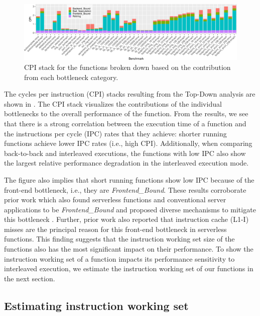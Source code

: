 \begin{figure}
  \centering
  \includegraphics[width=\textwidth]{figures/topdown_level1.pdf}
  \caption{\label{wosc:fig:topdown_level1} CPI stack for the functions broken down based on the contribution from each bottleneck category.}
\end{figure}

The cycles per instruction (CPI) stacks resulting from the Top-Down analysis are shown in . The CPI stack visualizes the contributions of the individual bottlenecks to the overall performance of the function. From the results, we see that there is a strong correlation between the execution time of a function and the instructions per cycle (IPC) rates that they achieve: shorter running functions achieve lower IPC rates (i.e., high CPI). Additionally, when comparing back-to-back and interleaved executions, the functions with low IPC also show the largest relative performance degradation in the interleaved execution mode.

The figure also implies that short running functions show low IPC because of the front-end bottleneck, i.e., they are \emph{Frontend\_Bound}. These results corroborate prior work which also found serverless functions and conventional server applications to be \emph{Frontend\_Bound} and proposed diverse mechanisms to mitigate this bottleneck \cite{btbx-pact, btbx-cal, twig, shotgun, boomerang, lukewarm_serverless}. Further, prior work \cite{lukewarm_serverless} also reported that instruction cache (L1-I) misses are the principal reason for this front-end bottleneck in serverless functions. This finding suggests that the instruction working set size of the functions also has the most significant impact on their performance. To show the instruction working set of a function impacts its performance sensitivity to interleaved execution, we estimate the instruction working set of our functions in the next section.


\subsection{Estimating instruction working set}

